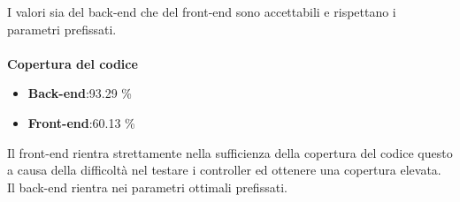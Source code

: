 I valori sia del back-end che del front-end sono accettabili e rispettano i parametri prefissati.
\\\\
\textbf{Copertura del codice}
\begin{itemize}
\item \textbf{Back-end}:93.29 \%
\item \textbf{Front-end}:60.13 \%
\end{itemize}
Il front-end rientra strettamente nella sufficienza della copertura del codice questo a causa della difficoltà nel testare i controller ed ottenere una copertura elevata.\\
Il back-end rientra nei parametri ottimali prefissati.
